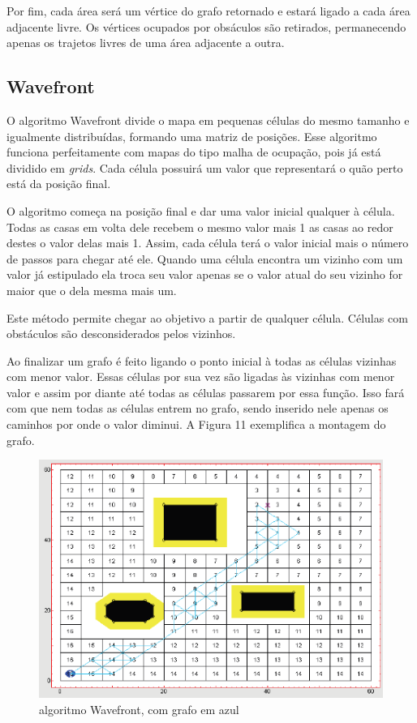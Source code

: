 Por fim, cada área será um vértice do grafo retornado e estará ligado a cada área adjacente livre.  Os vértices ocupados por obsáculos são retirados, permanecendo apenas os trajetos livres de uma área adjacente a outra.

\subsection{Wavefront}

O algoritmo Wavefront divide o mapa em pequenas células do mesmo tamanho e igualmente distribuídas, formando uma matriz de posições. Esse algoritmo funciona perfeitamente com mapas do tipo malha de ocupação, pois já está dividido em \textit{grids}. Cada célula possuirá um valor que representará o quão perto está da posição final.

O algoritmo começa na posição final e dar uma valor inicial qualquer à célula. Todas as casas em volta dele recebem o mesmo valor mais 1 as casas ao redor destes o valor delas mais 1. Assim, cada célula terá o valor inicial mais o número de passos para chegar até ele. Quando uma célula encontra um vizinho com um valor já estipulado ela troca seu valor apenas se o valor atual do seu vizinho for maior que o dela mesma mais um.

Este método permite chegar ao objetivo a partir de qualquer célula. Células com obstáculos são desconsiderados pelos vizinhos. 

Ao finalizar um grafo é feito ligando o ponto inicial à todas as células vizinhas com menor valor. Essas células por sua vez são ligadas às vizinhas com menor valor e assim por diante até todas as células passarem por essa função. Isso fará com que nem todas as células entrem no grafo, sendo inserido nele apenas os caminhos por onde o valor diminui. A Figura 11 exemplifica a montagem do grafo.

\begin{figure}[h]
	\centering
	\label{fig11}
		\includegraphics[keepaspectratio=true,scale=0.5]{figuras/10wavefront.png}
	\caption{algoritmo Wavefront, com grafo em azul \cite{MRIT_SITE}}
\end{figure}

